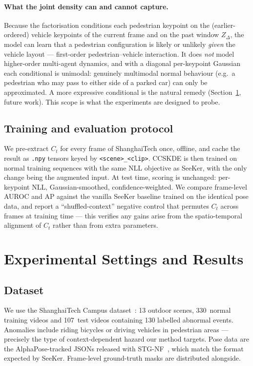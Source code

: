 \documentclass{article}
\begin{document}
\paragraph{What the joint density can and cannot capture.}
Because the factorisation conditions each pedestrian keypoint on the
(earlier-ordered) vehicle keypoints of the current frame and on the past window
$Z_\Delta$, the model can learn that a pedestrian configuration is likely or
unlikely \emph{given} the vehicle layout --- first-order pedestrian--vehicle
interaction. It does \emph{not} model higher-order multi-agent dynamics, and
with a diagonal per-keypoint Gaussian each conditional is unimodal: genuinely
multimodal normal behaviour (e.g.\ a pedestrian who may pass to either side of a
parked car) can only be approximated. A more expressive conditional is the
natural remedy (Section~\ref{sec:experiments}, future work). This scope is what
the experiments are designed to probe.

\subsection{Training and evaluation protocol}
\label{ssec:protocol}
We pre-extract $C_t$ for every frame of ShanghaiTech once, offline, and
cache the result as \texttt{.npy} tensors keyed by \texttt{<scene>\_<clip>}.
CCSKDE is then trained on normal training sequences with the same NLL
objective as SeeKer, with the only change being the augmented input. At
test time, scoring is unchanged: per-keypoint NLL, Gaussian-smoothed,
confidence-weighted. We compare frame-level AUROC and AP against the
vanilla SeeKer baseline trained on the identical pose data, and report a
``shuffled-context'' negative control that permutes $C_t$ across frames
at training time --- this verifies any gains arise from the spatio-temporal
alignment of $C_t$ rather than from extra parameters.

\section{Experimental Settings and Results}
\label{sec:experiments}

\subsection{Dataset}
We use the ShanghaiTech Campus dataset~\citep{liu2018future}: 13 outdoor
scenes, 330~normal training videos and 107~test videos containing 130
labelled abnormal events. Anomalies include riding bicycles or driving
vehicles in pedestrian areas --- precisely the type of context-dependent
hazard our method targets. Pose data are the AlphaPose-tracked
JSONs released with STG-NF~\citep{hirschorn2023normalizing}, which match
the format expected by SeeKer. Frame-level ground-truth masks are
distributed alongside.
\end{document}
